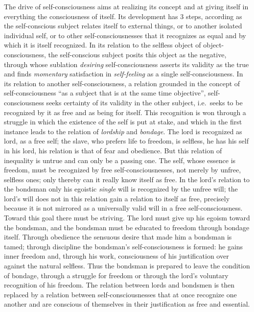 The drive of self-consciousness aims at realizing its concept and at
giving itself in everything the consciousness of itself. Its development
has 3 steps, according as the self-conscious subject relates itself to
external things, or to another isolated individual self, or to other
self-consciousnesses that it recognizes as equal and by which it is
itself recognized. In its relation to the selfless object of
object-consciousness, the self-conscious subject posits this object as
the negative, through whose sublation \emph{desiring} self-consciousness
asserts its validity as the true and finds \emph{momentary} satisfaction
in \emph{self-feeling} as a single self-consciousness. In its relation to
another self-consciousness, a relation grounded in the concept of
self-consciousness ``as a subject that is at the same time objective'',
self-consciousness seeks certainty of its validity in the other subject,
i.e.\ seeks to be recognized by it as free and as being for itself. This
recognition is won through a struggle in which the existence of the
self is put at stake, and which in the first instance leads to the
relation of \emph{lordship} and \emph{bondage}. The lord is recognized
as lord, as a free self; the slave, who prefers life to freedom, is
selfless, he has his self in his lord, his relation is that of fear and
obedience. But this relation of inequality is untrue and can only be a
passing one. The self, whose essence is freedom, must be recognized by
free self-consciousnesses, not merely by unfree, selfless ones; only
thereby can it really know itself as free. In the lord's relation to the
bondsman only his egoistic \emph{single} will is recognized by the
unfree will; the lord's will does not in this relation gain a relation
to itself as free, precisely because it is not mirrored as a universally
valid will in a free self-consciousness. Toward this goal there must be
striving. The lord must give up his egoism toward the bondsman, and the
bondsman must be educated to freedom through bondage itself. Through
obedience the sensuous desire that made him a bondsman is tamed; through
discipline the bondsman's self-consciousness is formed: he
gains inner freedom and, through his work, consciousness of his
justification over against the natural selfless. Thus the bondsman is
prepared to leave the condition of bondage, through a struggle for
freedom or through the lord's voluntary recognition of his freedom. The
relation between lords and bondsmen is then replaced by a relation
between self-consciousnesses that at once recognize one another and are
conscious of themselves in their justification as free and essential.

